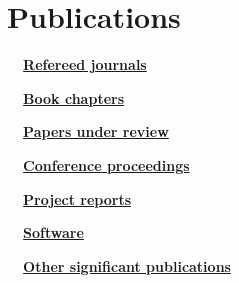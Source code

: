 \documentclass[A4,11pt]{article}
\makeatletter
\newcommand*{\newbibstartnumber}[1]{%
  \apptocmd{\thebibliography}{%
    \global\c@NAT@ctr #1\relax
    \addtocounter{NAT@ctr}{-1}%
  }{}{}%
}
\makeatother
\begin{document}
\section{Publications}

\vspace{2mm}
\noindent \textbf{\ \ \underline{Refereed journals}}
\begin{bibunit}
\nocite{apsrev42Control}
\nocite{Chen2021jgsy, Chen2019ijgis, Chen2018ijgis, Chen2017CEUS, Ren2020ijgis, Zhang2021cities, Qiao2011langmuir, Qiao2011jpcc, Qiao2010jpcb}
\putbib[publications]
\end{bibunit}

\vspace{2mm}
\noindent \textbf{\ \ \underline{Book chapters}}
\begin{bibunit}
\nocite{apsrev42Control}
\nocite{Chen2021chapter}
\putbib[publications]
\end{bibunit}

\vspace{2mm}
\noindent \textbf{\ \ \underline{Papers under review}}
\begin{bibunit}
\nocite{apsrev42Control}
\nocite{Huanfa2021trpc}
\putbib[publications]
\end{bibunit}

\vspace{2mm}
\noindent \textbf{\ \ \underline{Conference proceedings}}
\begin{bibunit}
\nocite{apsrev42Control}
\nocite{Huanfa2020gisruk,Huanfa2019gisruk,Huanfa2017gisruk,Huanfa2017geocomp,Yajie2013geocomp,Huanfa2013ICESEP,Hamed2013ICESEP}
\putbib[publications]
\end{bibunit}

\vspace{2mm}
\noindent \textbf{\ \ \underline{Project reports}}
\begin{bibunit}
\nocite{apsrev42Control}
\nocite{Cheng2016cpc}
\putbib[publications]
\end{bibunit}

\vspace{2mm}
\noindent \textbf{\ \ \underline{Software}}
\begin{bibunit}
\nocite{}
\putbib[publications]
\end{bibunit}

\vspace{2mm}
\noindent \textbf{\ \ \underline{Other significant publications}}
\newbibstartnumber{6}
\begin{bibunit}
\nocite{apsrev42Control}
\putbib[publications]
\end{bibunit}
\end{document}

